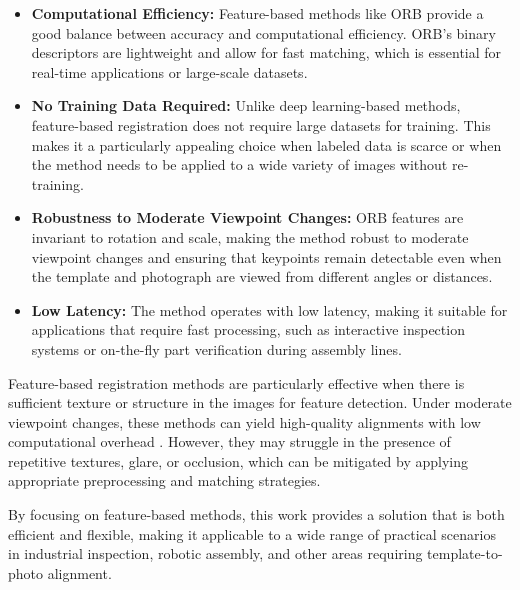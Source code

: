 \begin{itemize}
  \item \textbf{Computational Efficiency:} Feature-based methods like ORB provide a good balance between accuracy and computational efficiency. ORB's binary descriptors are lightweight and allow for fast matching, which is essential for real-time applications or large-scale datasets.
  \item \textbf{No Training Data Required:} Unlike deep learning-based methods, feature-based registration does not require large datasets for training. This makes it a particularly appealing choice when labeled data is scarce or when the method needs to be applied to a wide variety of images without re-training.
  \item \textbf{Robustness to Moderate Viewpoint Changes:} ORB features are invariant to rotation and scale, making the method robust to moderate viewpoint changes and ensuring that keypoints remain detectable even when the template and photograph are viewed from different angles or distances.
  \item \textbf{Low Latency:} The method operates with low latency, making it suitable for applications that require fast processing, such as interactive inspection systems or on-the-fly part verification during assembly lines.
\end{itemize}

Feature-based registration methods are particularly effective when there is sufficient texture or structure in the images for feature detection. Under moderate viewpoint changes, these methods can yield high-quality alignments with low computational overhead \citep{Rublee2011ORB,FischlerBolles1981}. However, they may struggle in the presence of repetitive textures, glare, or occlusion, which can be mitigated by applying appropriate preprocessing and matching strategies.

By focusing on feature-based methods, this work provides a solution that is both efficient and flexible, making it applicable to a wide range of practical scenarios in industrial inspection, robotic assembly, and other areas requiring template-to-photo alignment.

